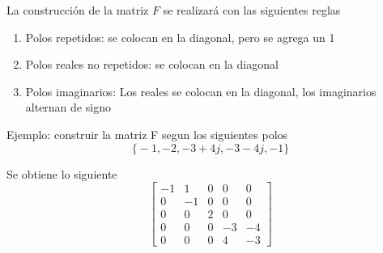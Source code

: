 La construcción de la matriz \( F \) se realizará con las siguientes reglas
\begin{enumerate}
    \item Polos repetidos: se colocan en la diagonal, pero se agrega un 1
    \item Polos reales no repetidos: se colocan en la diagonal
    \item Polos imaginarios: Los reales se colocan en la diagonal, los imaginarios alternan de signo
\end{enumerate}

Ejemplo: construir la matriz F segun los siguientes polos
\[
    \Big\{-1, -2, -3+4j, -3-4j, -1 \Big\}
\]

Se obtiene lo siguiente
\[
    \begin{bmatrix}
        -1 & 1 & 0 & 0 & 0 \\
        0 & -1 & 0 & 0 & 0 \\
        0 & 0 & 2 & 0 & 0 \\
        0 & 0 & 0 & -3 & -4 \\
        0 & 0 & 0 & 4 & -3
    \end{bmatrix}
\]
